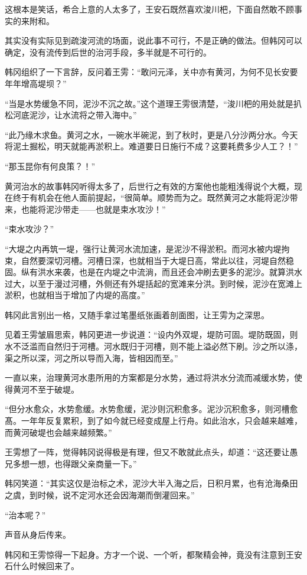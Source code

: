 这根本是笑话，希合上意的人太多了，王安石既然喜欢浚川杷，下面自然敢不顾事实的来附和。

其实没有实际见到疏浚河流的场面，说此事不可行，不是正确的做法。但韩冈可以确定，没有流传到后世的治河手段，多半就是不可行的。

韩冈组织了一下言辞，反问着王雱：“敢问元泽，关中亦有黄河，为何不见长安要年年增高堤坝？”

“当是水势缓急不同，泥沙不沉之故。”这个道理王雱很清楚，“浚川杷的用处就是扒松河底泥沙，让水流将之带入海中。”

“此乃缘木求鱼。黄河之水，一碗水半碗泥，到了秋时，更是八分沙两分水。今天将泥土掘松，明天就能再淤积上。难道要日日施行不成？这要耗费多少人工？！”

“那玉昆你有何良策？！”

黄河治水的故事韩冈听得太多了，后世行之有效的方案他也能粗浅得说个大概，现在终于有机会在他人面前提起，“很简单。顺势而为之。既然黄河之水能将泥沙带来，也能将泥沙带走——也就是束水攻沙！”

“束水攻沙？”

“大堤之内再筑一堤，强行让黄河水流加速，是泥沙不得淤积。而河水被内堤拘束，自然要深切河槽。河槽日深，也就相当于大堤日高，常此以往，河堤自然稳固。纵有洪水来袭，也是在内堤之中流淌，而且还会冲刷去更多的泥沙。就算洪水过大，以至于漫过河槽，外侧还有外堤括起的宽滩来分洪。到时候，泥沙在宽滩上淤积，也就相当于增加了内堤的高度。”

韩冈此言别出一格，又随手拿过笔墨纸张画着剖面图，让王雱为之深思。

见着王雱皱眉思索，韩冈更进一步说道：“设内外双堤，堤防可固。堤防既固，则水不泛滥而自然归于河槽。河水既归于河槽，则不能上溢必然下刷。沙之所以涤，渠之所以深，河之所以导而入海，皆相因而至。”

一直以来，治理黄河水患所用的方案都是分水势，通过将洪水分流而减缓水势，使得黄河不至于破堤。

“但分水愈众，水势愈缓。水势愈缓，泥沙则沉积愈多。泥沙沉积愈多，则河槽愈髙。一年年反复累积，到了如今就已经变成屋上行舟。如此治水，只会越来越难，而黄河破堤也会越来越频繁。”

王雱想了一阵，觉得韩冈说得极是有理，但又不敢就此点头，却道：“这还要让愚兄多想一想，也得跟父亲商量一下。”

韩冈笑道：“其实这仅是治标之术，泥沙大半入海之后，日积月累，也有沧海桑田之虞，到时候，说不定河水还会因海潮而倒灌回来。”

“治本呢？”

声音从身后传来。

韩冈和王雱惊得一下起身。方才一个说、一个听，都聚精会神，竟没有注意到王安石什么时候回来了。

